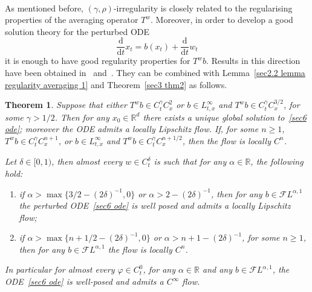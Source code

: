 \documentclass[10pt]{article}
\newcommand{\mathd}{\mathrm{d}}
\newtheorem{theorem}{Theorem}%
\begin{document}
\

As mentioned before, $(\gamma, \rho)$\mbox{-}irregularity is closely related
to the regularising properties of the averaging operator $T^w$. Moreover, in
order to develop a good solution theory for the perturbed ODE
\begin{equation}
  \frac{\mathd}{\mathd t} x_t = b (x_t) + \frac{\mathd}{\mathd t} w_t
  \label{sec6 ode}
\end{equation}
it is enough to have good regularity properties for $T^w b$. Results in this
direction have been obtained in~{\cite{catelliergubinelli}}
and~{\cite{galeatigubinelli_ode}}. They can be combined with Lemma~\ref{sec2.2
lemma regularity averaging 1} and Theorem~\ref{sec3 thm2} as follows.

\begin{theorem}
  \label{sec6 thm ode}Suppose that either $T^w b \in C^{\gamma}_t C^2_x$ or $b
  \in L^{\infty}_{t, x}$ and $T^w b \in C^{\gamma}_t C^{3 / 2}_x$, for some
  $\gamma > 1 / 2$. Then for any $x_0 \in \mathbb{R}^d$ there exists a unique
  global solution to~\eqref{sec6 ode}; moreover the ODE admits a locally
  Lipschitz flow. If, for some $n\geqslant 1$, $T^w b \in C^{\gamma}_t C^{n + 1}_x$, or $b \in
  L^{\infty}_{t, x}$ and $T^w b \in C^{\gamma}_t C^{n + 1 / 2}_x$, then the
  flow is locally $C^n$.
  
  Let $\delta \in [0, 1)$, then almost every $w \in C^{\delta}_t$ is such that
  for any $\alpha \in \mathbb{R}$, the following hold:
  \begin{enumerate}[label=\roman*.]
    \item if $\alpha > \max \{ 3 / 2 - (2 \delta)^{- 1}, 0 \}$ or $\alpha > 2
    - (2 \delta)^{- 1}$, then for any $b \in \mathcal{F} L^{\alpha, 1}$ the
    perturbed ODE~\eqref{sec6 ode} is well posed and admits a locally
    Lipschitz flow;
    
    \item if $\alpha > \max \{ n + 1 / 2 - (2 \delta)^{- 1}, 0 \}$ or $\alpha
    > n + 1 - (2 \delta)^{- 1}$, for some $n\geqslant 1$, then for any $b \in \mathcal{F} L^{\alpha,
    1}$ the flow is locally $C^n$.
  \end{enumerate}
  In particular for almost every $\varphi \in C^0_t$, for any $\alpha \in
  \mathbb{R}$ and any $b \in \mathcal{F} L^{\alpha, 1}$, the ODE~\eqref{sec6
  ode} is well\mbox{-}posed and admits a $C^{\infty}$ flow.
\end{theorem}
\end{document}
